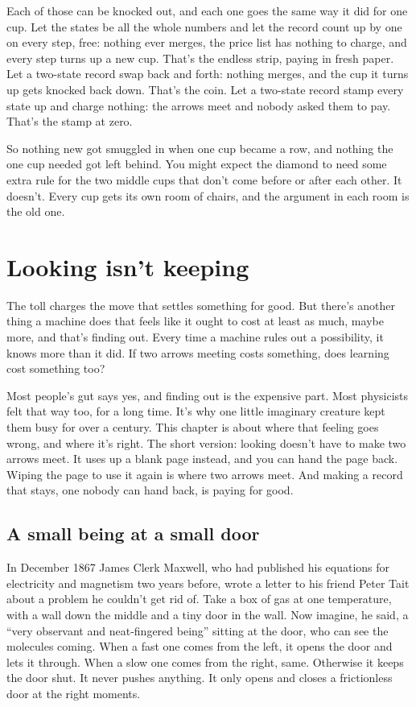 \documentclass[11pt,twoside]{article}
\theoremstyle{thielethm}
\theoremstyle{thieledef}
\theoremstyle{thieledef}
\theoremstyle{thieledef}
\theoremstyle{thielethm}
\theoremstyle{thieleobs}
\theoremstyle{thielethm}
\begin{document}
Each of those can be knocked out, and each one goes the same way it did for one cup. Let the states be all the whole numbers and let the record count up by one on every step, free: nothing ever merges, the price list has nothing to charge, and every step turns up a new cup. That's the endless strip, paying in fresh paper. Let a two-state record swap back and forth: nothing merges, and the cup it turns up gets knocked back down. That's the coin. Let a two-state record stamp every state up and charge nothing: the arrows meet and nobody asked them to pay. That's the stamp at zero.

So nothing new got smuggled in when one cup became a row, and nothing the one cup needed got left behind. You might expect the diamond to need some extra rule for the two middle cups that don't come before or after each other. It doesn't. Every cup gets its own room of chairs, and the argument in each room is the old one.

\section{Looking isn't keeping}
\label{sec:looking}

The toll charges the move that settles something for good. But there's another thing a machine does that feels like it ought to cost at least as much, maybe more, and that's finding out. Every time a machine rules out a possibility, it knows more than it did. If two arrows meeting costs something, does learning cost something too?

Most people's gut says yes, and finding out is the expensive part. Most physicists felt that way too, for a long time. It's why one little imaginary creature kept them busy for over a century. This chapter is about where that feeling goes wrong, and where it's right. The short version: looking doesn't have to make two arrows meet. It uses up a blank page instead, and you can hand the page back. Wiping the page to use it again is where two arrows meet. And making a record that stays, one nobody can hand back, is paying for good.

\subsection{A small being at a small door}

In December 1867 James Clerk Maxwell, who had published his equations for electricity and magnetism two years before, wrote a letter to his friend Peter Tait about a problem he couldn't get rid of. Take a box of gas at one temperature, with a wall down the middle and a tiny door in the wall. Now imagine, he said, a ``very observant and neat-fingered being'' sitting at the door, who can see the molecules coming. When a fast one comes from the left, it opens the door and lets it through. When a slow one comes from the right, same. Otherwise it keeps the door shut. It never pushes anything. It only opens and closes a frictionless door at the right moments.
\end{document}
